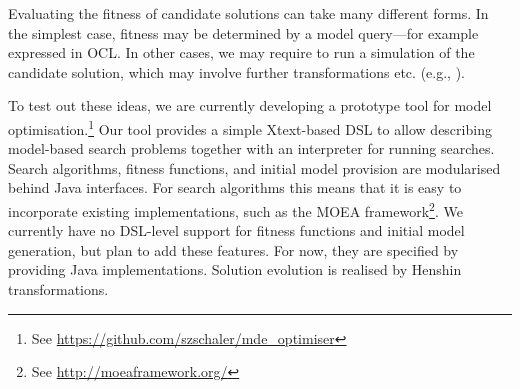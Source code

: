 	
	Evaluating the fitness of candidate solutions can take many different forms. In the simplest case, fitness may be determined by a model query---for example expressed in OCL. In other cases, we may
	require to run a simulation of the candidate solution, which may involve further transformations etc. (e.g., \cite{Efstathiou+14,Chatziprimou+14}).
	
	To test out these ideas, we are currently developing a prototype tool for model optimisation.\footnote{See \url{https://github.com/szschaler/mde_optimiser}} Our tool provides a simple Xtext-based
	DSL to allow describing model-based search problems together with an interpreter for running searches. Search algorithms, fitness functions, and initial model provision are modularised behind Java
	interfaces. For search algorithms this means that it is easy to incorporate existing implementations, such as the MOEA framework\footnote{See \url{http://moeaframework.org/}}. We currently have no
	DSL-level support for fitness functions and initial model generation, but plan to add these features. For now, they are specified by providing Java implementations. Solution evolution is realised by
	Henshin transformations.
	
